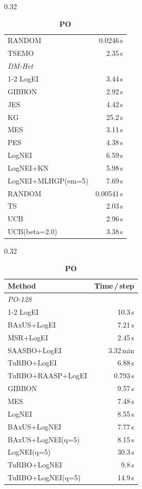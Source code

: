 \begin{table}[h]
\begin{subtable}[t]{0.32\textwidth}
\begin{tabular}{lr}
      RANDOM & 0.0246\,s \\
      TSEMO & 2.35\,s \\
      \midrule
      \multicolumn{2}{l}{\textit{DM-Het}} \\
      \cmidrule{1-2}
      LogEI & 3.44\,s \\
      GIBBON & 2.92\,s \\
      JES & 4.42\,s \\
      KG & 25.2\,s \\
      MES & 3.11\,s \\
      PES & 4.38\,s \\
      LogNEI & 6.59\,s \\
      LogNEI+KN & 5.98\,s \\
      LogNEI+MLHGP(em=5) & 7.69\,s \\
      RANDOM & 0.00541\,s \\
      TS & 2.03\,s \\
      UCB & 2.96\,s \\
      UCB(beta=2.0) & 3.38\,s \\
      \bottomrule
    \end{tabular}
  \end{subtable}
  \hfill
  \begin{subtable}[t]{0.32\textwidth}
    \centering
    \footnotesize
    \caption{\textbf{PO}}
    \begin{tabular}{lr}
      \toprule
      \textbf{Method} & \textbf{Time\,/\,step} \\
      \midrule
      \multicolumn{2}{l}{\textit{PO-128}} \\
      \cmidrule{1-2}
      LogEI & 10.3\,s \\
      BAxUS+LogEI & 7.21\,s \\
      MSR+LogEI & 2.45\,s \\
      SAASBO+LogEI & 3.32\,min \\
      TuRBO+LogEI & 6.88\,s \\
      TuRBO+RAASP+LogEI & 0.793\,s \\
      GIBBON & 9.57\,s \\
      MES & 7.48\,s \\
      LogNEI & 8.55\,s \\
      BAxUS+LogNEI & 7.77\,s \\
      BAxUS+LogNEI(q=5) & 8.15\,s \\
      LogNEI(q=5) & 30.3\,s \\
      TuRBO+LogNEI & 9.8\,s \\
      TuRBO+LogNEI(q=5) & 14.9\,s \\

\end{tabular}
\end{subtable}
\end{table}
